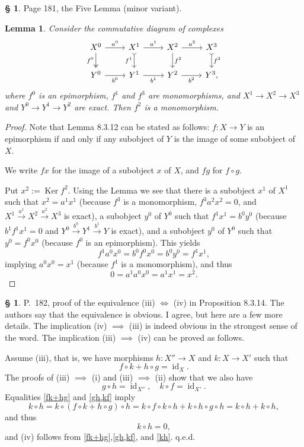 \documentclass[12pt]{article}
\newtheorem{lem}[thm]{Lemma}
\theoremstyle{remark}
\theoremstyle{definition}
\newtheorem{s}[thm]{\S}
\newcommand{\mv}{ (minor variant)}
\DeclareMathOperator{\id}{id}
\DeclareMathOperator{\Ker}{Ker}
\begin{document}
\begin{s} 
Page 181, the Five Lemma\mv. 
%
\begin{lem} 
Consider the commutative diagram of complexes 
$$
\begin{tikzcd}
X^0\arrow[two heads]{d}[swap]{f^0}\arrow{r}{a^0}&
X^1\arrow[tail]{d}[swap]{f^1}\arrow{r}{a^1}&
X^2\arrow{d}{f^2}\arrow{r}{a^2}&
X^3\arrow[tail]{d}{f^3}\\ 
Y^0\arrow{r}[swap]{b^0}&
Y^1\arrow{r}[swap]{b^1}&
Y^2\arrow{r}[swap]{b^2}&
Y^3,
\end{tikzcd}
$$
where $f^0$ is an epimorphism, $f^1$ and $f^3$ are monomorphisms, and $X^1\to X^2\to X^3$ and $Y^0\to Y^1\to Y^2$ are exact. Then $f^2$ is a monomorphism. 
\end{lem} 
%
\begin{proof}
Note that Lemma 8.3.12 can be stated as follows: $f:X\to Y$ is an epimorphism if and only if any subobject of $Y$ is the image of some subobject of $X$. 

We write $fx$ for the image of a subobject $x$ of $X$, and $fg$ for $f\circ g$.

Put $x^2:=\Ker f^2$. Using the Lemma we see that there is a subobject $x^1$ of $X^1$ such that $x^2=a^1x^1$ (because $f^3$ is a monomorphism, $f^3a^2x^2=0$, and $X^1\overset{a^1}{\to}X^2\overset{a^2}{\to}X^3$ is exact), a subobject $y^0$ of $Y^0$ such that $f^1x^1=b^0y^0$ (because $b^1f^1x^1=0$ and $Y^0\overset{b^0}{\to}Y^1\overset{b^1}{\to}Y$ is exact), and a subobject $y^0$ of $Y^0$ such that $y^0=f^0x^0$ (because $f^0$ is an epimorphism). This yields 
$$
f^1a^0x^0=b^0f^0x^0=b^0y^0=f^1x^1,
$$
implying $a^0x^0=x^1$ (because $f^1$ is a monomorphism), and thus 
$$
0=a^1a^0x^0=a^1x^1=x^2.
$$
\end{proof}
\end{s}
%
%
\begin{s} 
P.~182, proof of the equivalence (iii) $\iff$ (iv) in Proposition 8.3.14. The authors say that the equivalence is obvious. I agree, but here are a few more details. The implication (iv) $\implies$ (iii) is indeed obvious in the strongest sense of the word. The implication (iii) $\implies$ (iv) can be proved as follows. 

Assume (iii), that is, we have morphisms $h:X''\to X$ and $k:X\to X'$ such that 
\begin{equation}\label{fk+hg} 
f\circ k+h\circ g=\id_X.
\end{equation} 
The proofs of (iii) $\implies$ (i) and (iii) $\implies$ (ii) show that we also have 
\begin{equation}\label{gh,kf} 
g\circ h=\id_{X''},\quad k\circ f=\id_{X'}.
\end{equation} 
Equalities \eqref{fk+hg} and \eqref{gh,kf} imply 
$$
k\circ h=k\circ(f\circ k+h\circ g)\circ h=k\circ f\circ k\circ h+k\circ h\circ g\circ h=k\circ h+k\circ h,
$$ 
and thus 
\begin{equation}\label{kh} 
k\circ h=0, 
\end{equation} 
and (iv) follows from \eqref{fk+hg},\eqref{gh,kf}, and \eqref{kh}. q.e.d.
\end{s}
\end{document}
